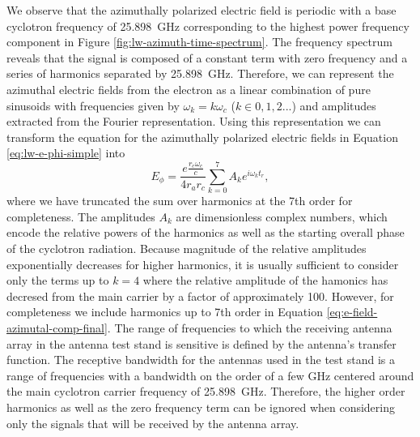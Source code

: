 We observe that the azimuthally polarized electric field is periodic with a base cyclotron frequency of 25.898~GHz corresponding to the highest power frequency component in Figure \ref{fig:lw-azimuth-time-spectrum}. The frequency spectrum reveals that the signal is composed of a constant term with zero frequency and a series of harmonics separated by 25.898~GHz. Therefore, we can represent the azimuthal electric fields from the electron as a linear combination of pure sinusoids with frequencies given by $\omega_k=k\omega_c$ ($k\in0,1,2...$) and amplitudes extracted from the Fourier representation. Using this representation we can transform the equation for the azimuthally polarized electric fields in Equation \ref{eq:lw-e-phi-simple} into 
\begin{equation}
    \label{eq:e-field-azimutal-comp-final}
    E_\phi = \frac{e\frac{r_c\omega_c}{c}}{4r_{a}r_c}\sum_{k=0}^7{A_k e^{i\omega_k t_{r}}},
\end{equation}
where we have truncated the sum over harmonics at the 7th order for completeness. The amplitudes $A_k$ are dimensionless complex numbers, which encode the relative powers of the harmonics as well as the starting overall phase of the cyclotron radiation. Because magnitude of the relative amplitudes exponentially decreases for higher harmonics, it is usually sufficient to consider only the terms up to $k=4$ where the relative amplitude of the hamonics has decresed from the main carrier by a factor of approximately 100. However, for completeness we include harmonics up to 7th order in Equation \ref{eq:e-field-azimutal-comp-final}. The range of frequencies to which the receiving antenna array in the antenna test stand is sensitive is defined by the antenna's transfer function. The receptive bandwidth for the antennas used in the test stand is a range of frequencies with a bandwidth on the order of a few GHz centered around the main cyclotron carrier frequency of 25.898~GHz. Therefore, the higher order harmonics as well as the zero frequency term can be ignored when considering only the signals that will be received by the antenna array.


